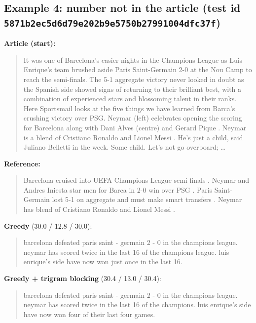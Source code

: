\documentclass[10pt,a4paper]{article}
\begin{document}
\hypertarget{example-4-number-not-in-the-article-test-id-5871b2ec5d6d79e202b9e5750b27991004dfc37f}{%
\subsection{\texorpdfstring{Example 4: number not in the article (test id \texttt{5871b2ec5d6d79e202b9e5750b27991004dfc37f})}{Example 4: number not in the article (test id 5871b2ec5d6d79e202b9e5750b27991004dfc37f)}}\label{example-4-number-not-in-the-article-test-id-5871b2ec5d6d79e202b9e5750b27991004dfc37f}}

\textbf{Article (start):}

\begin{quote}
It was one of Barcelona's easier nights in the Champions League as Luis Enrique's team brushed aside Paris Saint-Germain 2-0 at the Nou Camp to reach the semi-finals. The 5-1 aggregate victory never looked in doubt as the Spanish side showed signs of returning to their brilliant best, with a combination of experienced stars and blossoming talent in their ranks. Here Sportsmail looks at the five things we have learned from Barca's crushing victory over PSG. Neymar (left) celebrates opening the scoring for Barcelona along with Dani Alves (centre) and Gerard Pique . Neymar is a blend of Cristiano Ronaldo and Lionel Messi . He's just a child, said Juliano Belletti in the week. Some child. Let's not go overboard; \ldots{}
\end{quote}

\textbf{Reference:}

\begin{quote}
Barcelona cruised into UEFA Champions League semi-finals .
Neymar and Andres Iniesta star men for Barca in 2-0 win over PSG .
Paris Saint-Germain lost 5-1 on aggregate and must make smart transfers .
Neymar has blend of Cristiano Ronaldo and Lionel Messi .
\end{quote}

\textbf{Greedy} (30.0 / 12.8 / 30.0):

\begin{quote}
barcelona defeated paris saint - germain 2 - 0 in the champions league.
neymar has scored twice in the last 16 of the champions league.
luis enrique's side have now won just once in the last 16.
\end{quote}

\textbf{Greedy + trigram blocking} (30.4 / 13.0 / 30.4):

\begin{quote}
barcelona defeated paris saint - germain 2 - 0 in the champions league.
neymar has scored twice in the last 16 of the champions.
luis enrique's side have now won four of their last four games.
\end{quote}
\end{document}
